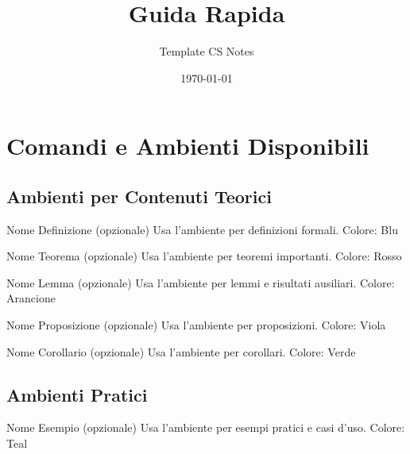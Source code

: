 \documentclass{csnotes}
\title{Guida Rapida}
\author{Template CS Notes}
\date{\today}
\begin{document}
\maketitlepage{}
\tableofcontents
\newpage


\section{Comandi e Ambienti Disponibili}

\subsection{Ambienti per Contenuti Teorici}\label{sec:theoretical_environments}

\begin{definition}{Nome Definizione (opzionale)}
Usa l'ambiente  per definizioni formali.
Colore: Blu
\end{definition}

\begin{theorem}{Nome Teorema (opzionale)}
Usa l'ambiente  per teoremi importanti.
Colore: Rosso
\end{theorem}

\begin{lemma}{Nome Lemma (opzionale)}
Usa l'ambiente  per lemmi e risultati ausiliari.
Colore: Arancione
\end{lemma}

\begin{proposition}{Nome Proposizione (opzionale)}
Usa l'ambiente  per proposizioni.
Colore: Viola
\end{proposition}

\begin{corollary}{Nome Corollario (opzionale)}
Usa l'ambiente  per corollari.
Colore: Verde
\end{corollary}

\subsection{Ambienti Pratici}\label{sec:practical_environments}

\begin{example}{Nome Esempio (opzionale)}
Usa l'ambiente  per esempi pratici e casi d'uso.
Colore: Teal
\end{example}
\end{document}
